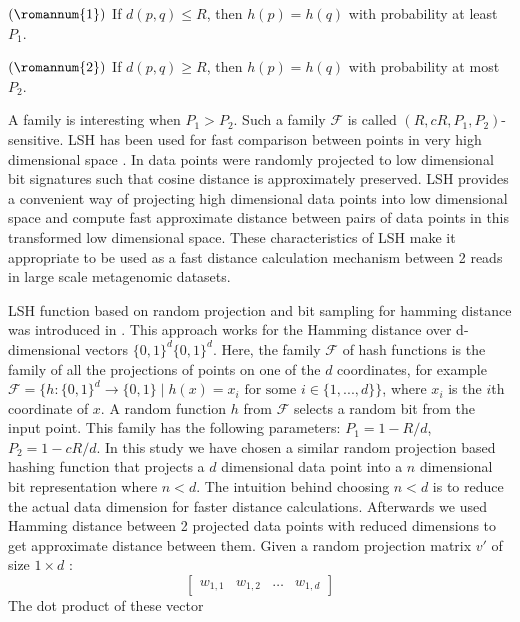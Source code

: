 \documentclass[10pt, conference, compsocconf]{IEEEtran}
\begin{document}
$(\romannum{1})$ If ${\displaystyle d(p,q)\leq R}$, then ${\displaystyle h(p)=h(q)}$ with probability at least ${\displaystyle P_{1}}$.
 
$(\romannum{2})$ If ${\displaystyle d(p,q)\geq R}$, then ${\displaystyle h(p)=h(q)}$ with probability at most ${\displaystyle P_{2}}$.

A family is interesting when ${\displaystyle P_{1}>P_{2}}$. Such a family ${\displaystyle {\mathcal {F}}}$ is called ${\displaystyle (R,cR,P_{1},P_{2})}$-sensitive. LSH has been used for fast comparison between points in very high dimensional space \cite{MARLshRef3}. In \cite{MARLshRef4} data points were randomly projected to low dimensional bit signatures such that cosine distance is approximately preserved. LSH provides a convenient way of projecting high dimensional data points into low dimensional space and compute fast approximate distance between pairs of data points in this transformed low dimensional space. These characteristics of LSH make it appropriate to be used as a fast distance calculation mechanism between 2 reads in large scale metagenomic datasets.

LSH function based on random projection and bit sampling for hamming distance was introduced in \cite{MARLshRef3}. This approach works for the Hamming distance over d-dimensional vectors ${\displaystyle \{0,1\}^{d}} \{0,1\}^{d}$. Here, the family ${\displaystyle {\mathcal {F}}}$ of hash functions is the family of all the projections of points on one of the ${\displaystyle d}$ coordinates, for example ${\displaystyle {\mathcal {F}}=\{h:\{0,1\}^{d}\to \{0,1\}\mid h(x)=x_{i}{\text{ for some }}i\in \{1,...,d\}\}}$, where ${\displaystyle x_{i}}$ is the ${\displaystyle i}$th coordinate of ${\displaystyle x}$. A random function ${\displaystyle h}$ from ${\displaystyle {\mathcal {F}}}$ selects a random bit from the input point. This family has the following parameters: ${\displaystyle P_{1}=1-R/d}$, ${\displaystyle P_{2}=1-cR/d}$. In this study we have chosen a similar random projection based hashing function that projects a $d$ dimensional data point into a $n$ dimensional bit representation where $n<d$. The intuition behind choosing $n<d$ is to reduce the actual data dimension for faster distance calculations. Afterwards we used Hamming distance between 2 projected data points with reduced dimensions to get approximate distance between them.
Given a random projection matrix $v'$ of size $1 \times d$ :
\begin{equation*}
\begin{bmatrix}
w_{1,1} & w_{1,2} & \hdots & w_{1,d} 
\end{bmatrix}
\end{equation*}      
The dot product of these vector
\end{document}

